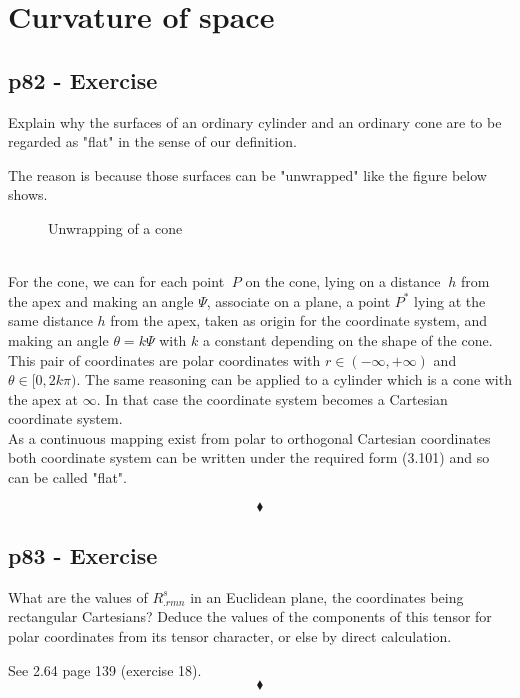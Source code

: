 \chapter{Curvature of space}
\pagebreak[4]

\section{p82 - Exercise}
\begin{tcolorbox}
Explain why the surfaces of an ordinary cylinder and an ordinary cone are to be regarded as "flat" in the sense of our definition.
\end{tcolorbox}
The reason is because those surfaces can be "unwrapped" like the figure below shows. 
\begin{figure}[h]

\caption{Unwrapping of a cone}
\end{figure}\\
For the cone, we can for each point $\ P $ on the cone, lying on a distance $\ h $ from the apex and making an angle $\Psi $,  associate on a plane,  a  point $ P^* $ lying at the same  distance $ h $ from the apex, taken as origin for the coordinate system, and making an angle $\theta =  k\Psi $ with $ k $ a constant depending on the shape of the cone. This pair of coordinates are polar coordinates with $ r \in (-\infty, + \infty)$ and $\theta \in [0, 2k\pi)$. 
The same reasoning can be applied to a cylinder which is a cone with the apex at $\infty$. In that case the coordinate system becomes a Cartesian coordinate system. \\
As a continuous mapping exist from polar to orthogonal Cartesian coordinates both  coordinate system can be written under the required form (3.101) and so can be called "flat".

$$\blacklozenge$$
\newpage

\section{p83 - Exercise}
\begin{tcolorbox}
What are the values of $R^s_{.rmn}$ in an Euclidean plane, the coordinates being rectangular Cartesians? Deduce the values of the components of this tensor for polar coordinates from its tensor character, or else by direct calculation.
\end{tcolorbox}
See 2.64 page 139 (exercise 18).
$$\blacklozenge$$
\newpage

